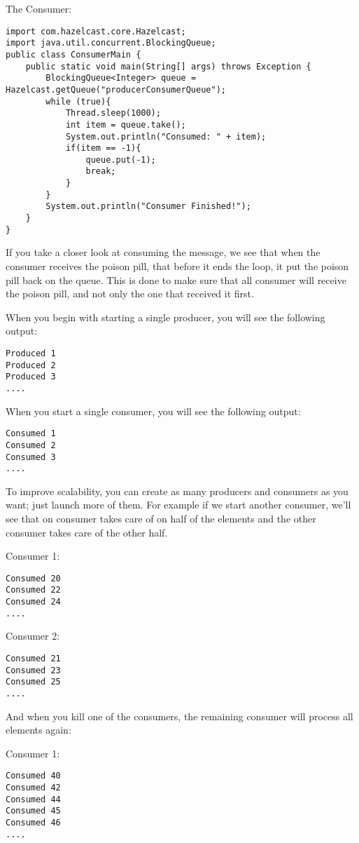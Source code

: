 The Consumer:
\begin{verbatim}
import com.hazelcast.core.Hazelcast;
import java.util.concurrent.BlockingQueue;
public class ConsumerMain {
    public static void main(String[] args) throws Exception {
        BlockingQueue<Integer> queue = Hazelcast.getQueue("producerConsumerQueue");
        while (true){
            Thread.sleep(1000);  
            int item = queue.take();
            System.out.println("Consumed: " + item);
            if(item == -1){
                queue.put(-1);
                break;
            }           
        }
        System.out.println("Consumer Finished!");
    }
}
\end{verbatim}
If you take a closer look at consuming the message, we see that when the consumer receives the poison pill,
that before it ends the loop, it put the poison pill back on the queue. This is done to make sure that all
consumer will receive the poison pill, and not only the one that received it first.

When you begin with starting a single producer, you will see the following output:
\begin{verbatim}
Produced 1
Produced 2
Produced 3
....
\end{verbatim}

When you start a single consumer, you will see the following output:
\begin{verbatim}
Consumed 1
Consumed 2
Consumed 3
....
\end{verbatim}

To improve scalability, you can create as many producers and consumers as you want; just launch 
more of them. For example if we start another consumer, we'll see that on consumer takes care of
on half of the elements and the other consumer takes care of the other half.

Consumer 1:
\begin{verbatim}
Consumed 20
Consumed 22
Consumed 24
....
\end{verbatim}

Consumer 2:
\begin{verbatim}
Consumed 21
Consumed 23
Consumed 25
....
\end{verbatim}

And when you kill one of the consumers, the remaining consumer will process all elements again:

Consumer 1:
\begin{verbatim}
Consumed 40  
Consumed 42 
Consumed 44 
Consumed 45
Consumed 46
....
\end{verbatim}

